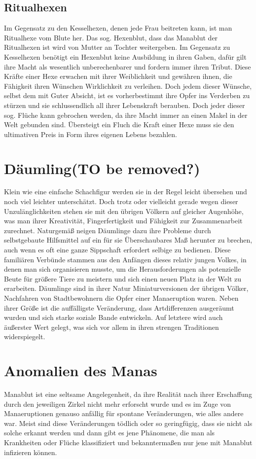\documentclass[a4paper,12pt,oneside]{book}
\begin{document}
\section{Ritualhexen}
Im Gegensatz zu den Kesselhexen, denen jede Frau beitreten kann, ist man Ritualhexe vom Blute her. Das sog. Hexenblut, dass das Manablut der Ritualhexen ist wird von Mutter an Tochter weitergeben. Im Gegensatz zu Kesselhexen benötigt ein Hexenblut keine Ausbildung in ihren Gaben, dafür gilt ihre Macht als wesentlich unberechenbarer und fordern immer ihren Tribut. Diese Kräfte einer Hexe erwachen mit ihrer Weiblichkeit und gewähren ihnen, die Fähigkeit ihren Wünschen Wirklichkeit zu verleihen. Doch jedem dieser Wünsche, selbst dem mit Guter Absicht, ist es vorherbestimmt ihre Opfer ins Verderben zu stürzen und sie schlussendlich all ihrer Lebenskraft berauben. Doch jeder dieser sog. Flüche kann gebrochen werden, da ihre Macht immer an einen Makel in der Welt gebunden sind. Übersteigt ein Fluch die Kraft einer Hexe muss sie den ultimativen Preis in Form ihres eigenen Lebens bezahlen.    

\chapter{Däumling(TO be removed?)}
Klein wie eine einfache Schachfigur werden sie in der Regel leicht übersehen und noch viel leichter unterschätzt. Doch trotz oder vielleicht gerade wegen dieser Unzulänglichkeiten stehen sie mit den übrigen Völkern auf gleicher Augenhöhe, was man ihrer Kreativität, Fingerfertigkeit und Fähigkeit zur Zusammenarbeit zurechnet. Naturgemäß neigen Däumlinge dazu ihre Probleme durch selbstgebaute Hilfsmittel auf ein für sie Überschaubares Maß herunter zu brechen, auch wenn es oft eine ganze Sippschaft erfordert selbige zu bedienen. Diese familiären Verbünde stammen aus den Anfängen dieses relativ jungen Volkes, in denen man sich organisieren musste, um die Herausforderungen als potenzielle Beute für größere Tiere zu meistern und sich einen neuen Platz in der Welt zu erarbeiten. Däumlinge sind in ihrer Natur Miniaturversionen der übrigen Völker, Nachfahren von Stadtbewohnern die Opfer einer Manaeruption waren. Neben ihrer Größe ist die auffälligste Veränderung, dass Artdifferenzen ausgeräumt wurden und sich starke soziale Bande entwickeln. Auf letztere wird auch äußerster Wert gelegt, was sich vor allem in ihren strengen Traditionen widerspiegelt.

\chapter{Anomalien des Manas}
Manablut ist eine seltsame Angelegenheit, da ihre Realität nach ihrer Erschaffung durch den jeweiligen Zirkel nicht mehr erforscht wurde und es im Zuge von Manaeruptionen genauso anfällig für spontane Veränderungen, wie alles andere war. Meist sind diese Veränderungen tödlich oder so geringfügig, dass sie nicht als solche erkannt werden und dann gibt es jene Phänomene, die man als Krankheiten oder Flüche klassifiziert und bekanntermaßen nur jene mit Manablut infizieren können.
\end{document}
